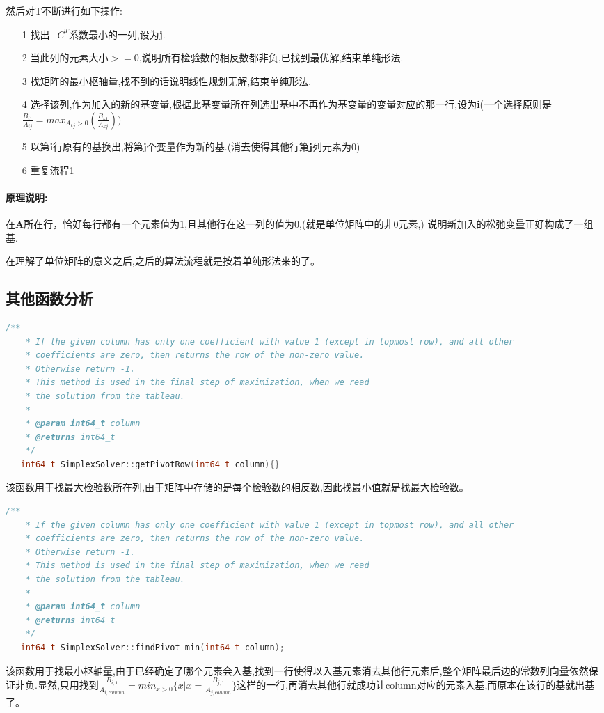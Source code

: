 然后对T不断进行如下操作:
\begin{itemize}
    \item[1] 找出$-C^{T}$系数最小的一列,设为\textbf{j}.
    \item[2] 当此列的元素大小$>=0$,说明所有检验数的相反数都非负,已找到最优解,结束单纯形法.
    \item[3] 找矩阵的最小枢轴量,找不到的话说明线性规划无解,结束单纯形法.
    \item[4] 选择该列,作为加入的新的基变量,根据此基变量所在列选出基中不再作为基变量的变量对应的那一行,设为\textbf{i}(一个选择原则是$\frac{B_{i1}}{A_{ij}}=max_{A_{kj}>0}(\frac{B_{k1}}{A_{kj}}))$
    \item[5] 以第\textbf{i}行原有的基换出,将第\textbf{j}个变量作为新的基.(消去使得其他行第\textbf{j}列元素为$0$)
    \item[6] 重复流程1
\end{itemize}

\paragraph{原理说明: } 在\textbf{A}所在行，恰好每行都有一个元素值为$1$,且其他行在这一列的值为$0$,(就是单位矩阵中的非$0$元素,) 说明新加入的松弛变量正好构成了一组基.

在理解了单位矩阵的意义之后,之后的算法流程就是按着单纯形法来的了。

\subsection{其他函数分析}
\begin{lstlisting}[language=C++]
    /**
    * If the given column has only one coefficient with value 1 (except in topmost row), and all other
    * coefficients are zero, then returns the row of the non-zero value.
    * Otherwise return -1.
    * This method is used in the final step of maximization, when we read
    * the solution from the tableau.
    * 
    * @param int64_t column
    * @returns int64_t
    */
   int64_t SimplexSolver::getPivotRow(int64_t column){}
\end{lstlisting}

该函数用于找最大检验数所在列,由于矩阵中存储的是每个检验数的相反数,因此找最小值就是找最大检验数。

\begin{lstlisting}[language=C++]
    /**
    * If the given column has only one coefficient with value 1 (except in topmost row), and all other
    * coefficients are zero, then returns the row of the non-zero value.
    * Otherwise return -1.
    * This method is used in the final step of maximization, when we read
    * the solution from the tableau.
    * 
    * @param int64_t column
    * @returns int64_t
    */
   int64_t SimplexSolver::findPivot_min(int64_t column);
\end{lstlisting}

该函数用于找最小枢轴量,由于已经确定了哪个元素会入基,找到一行使得以入基元素消去其他行元素后,整个矩阵最后边的常数列向量依然保证非负.显然,只用找到$\frac{B_{i,1}}{A_{i,column}}=min_{x>0}\{ x|x=\frac{B_{j,1}}{A_{j,column}} \}$这样的一行,再消去其他行就成功让column对应的元素入基,而原本在该行的基就出基了。